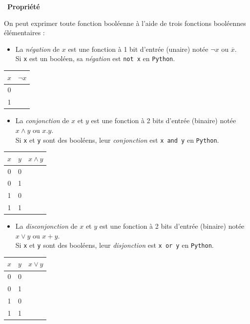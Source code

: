 \documentclass[
  11pt,
]{article}
\newcommand{\passthrough}[1]{#1}
\providecommand{\tightlist}{%
  \setlength{\itemsep}{0pt}\setlength{\parskip}{0pt}}
\newcounter{prop}
\newenvironment{propriete}[1]
{\par \medskip   \addtocounter{prop}{1} \noindent  
\begin{bclogo}[arrondi =0.1,  ombre = true, barre=none, logo=\bcbook, marge=4]{~\textbf{Propriété} \textbf{\theprop} {\itshape #1} }   \par}
{
\end{bclogo}
 \par \bigskip }
\begin{document}
\begin{propriete}{}

On peut exprimer toute fonction booléenne à l'aide de trois fonctions
booléennes élémentaires :

\begin{itemize}
\tightlist
\item
  La \emph{négation} de \(x\) est une fonction à 1 bit d'entrée (unaire)
  notée \(\neg x\) ou \(\overline{x}\).\\
  Si \passthrough{\lstinline!x!} est un booléen, sa \emph{négation} est
  \passthrough{\lstinline!not x!} en \passthrough{\lstinline!Python!}.
\end{itemize}

\begin{longtable}[]{@{}cl@{}}
\toprule
\(x\) & \(\neg x\)\tabularnewline
\midrule
\endhead
0 &\tabularnewline
1 &\tabularnewline
\bottomrule
\end{longtable}

\begin{itemize}
\tightlist
\item
  La \emph{conjonction} de \(x\) et \(y\) est une fonction à 2 bits
  d'entrée (binaire) notée \(x \wedge y\) ou \(x . y\).\\
  Si \passthrough{\lstinline!x!} et \passthrough{\lstinline!y!} sont des
  booléens, leur \emph{conjonction} est
  \passthrough{\lstinline!x and y!} en \passthrough{\lstinline!Python!}.
\end{itemize}

\begin{longtable}[]{@{}cll@{}}
\toprule
\(x\) & \(y\) & \(x \wedge y\)\tabularnewline
\midrule
\endhead
0 & 0 &\tabularnewline
0 & 1 &\tabularnewline
1 & 0 &\tabularnewline
1 & 1 &\tabularnewline
\bottomrule
\end{longtable}

\begin{itemize}
\tightlist
\item
  La \emph{disconjonction} de \(x\) et \(y\) est une fonction à 2 bits
  d'entrée (binaire) notée \(x \vee y\) ou \(x + y\).\\
  Si \passthrough{\lstinline!x!} et \passthrough{\lstinline!y!} sont des
  booléens, leur \emph{disjonction} est \passthrough{\lstinline!x or y!}
  en \passthrough{\lstinline!Python!}.
\end{itemize}

\begin{longtable}[]{@{}cll@{}}
\toprule
\(x\) & \(y\) & \(x \vee y\)\tabularnewline
\midrule
\endhead
0 & 0 &\tabularnewline
0 & 1 &\tabularnewline
1 & 0 &\tabularnewline
1 & 1 &\tabularnewline
\bottomrule
\end{longtable}

\end{propriete}
\end{document}
